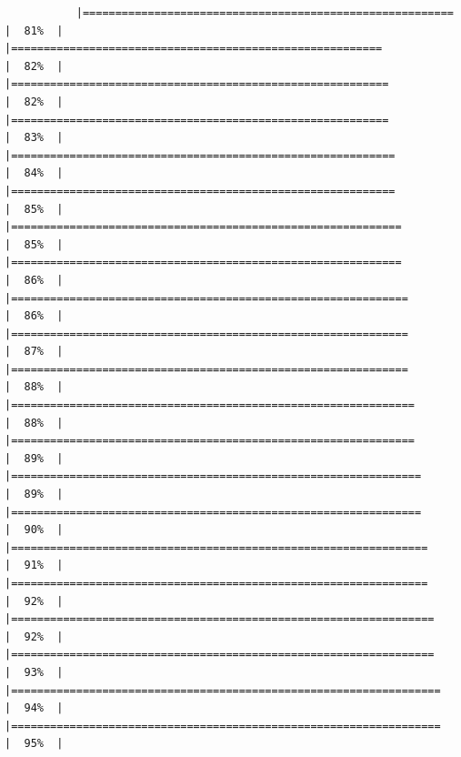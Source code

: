 \documentclass[
]{article}
\begin{document}
\begin{verbatim}
           |=========================================================             |  81%  |                                                                              |=========================================================             |  82%  |                                                                              |==========================================================            |  82%  |                                                                              |==========================================================            |  83%  |                                                                              |===========================================================           |  84%  |                                                                              |===========================================================           |  85%  |                                                                              |============================================================          |  85%  |                                                                              |============================================================          |  86%  |                                                                              |=============================================================         |  86%  |                                                                              |=============================================================         |  87%  |                                                                              |=============================================================         |  88%  |                                                                              |==============================================================        |  88%  |                                                                              |==============================================================        |  89%  |                                                                              |===============================================================       |  89%  |                                                                              |===============================================================       |  90%  |                                                                              |================================================================      |  91%  |                                                                              |================================================================      |  92%  |                                                                              |=================================================================     |  92%  |                                                                              |=================================================================     |  93%  |                                                                              |==================================================================    |  94%  |                                                                              |==================================================================    |  95%  |                                                                    
\end{verbatim}
\end{document}
